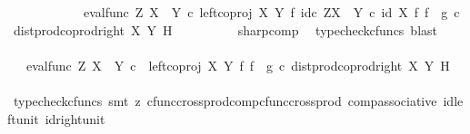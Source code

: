 \begin{isabellebody}
\ \ \ \ \ \ \ \ \ \ \ \ {\isacharparenleft}{\kern0pt}{\isacharparenleft}{\kern0pt}eval{\isacharunderscore}{\kern0pt}func\ Z\ {\isacharparenleft}{\kern0pt}X\ {\isasymCoprod}\ Y{\isacharparenright}{\kern0pt}\ {\isasymcirc}\isactrlsub c\ left{\isacharunderscore}{\kern0pt}coproj\ X\ Y\ {\isasymtimes}\isactrlsub f\ id\isactrlsub c\ {\isacharparenleft}{\kern0pt}Z\isactrlbsup {\isacharparenleft}{\kern0pt}X\ {\isasymCoprod}\ Y{\isacharparenright}{\kern0pt}\isactrlesup {\isacharparenright}{\kern0pt}{\isacharparenright}{\kern0pt}\ {\isasymcirc}\isactrlsub c\ {\isacharparenleft}{\kern0pt}id\ X\ {\isasymtimes}\isactrlsub f\ {\isacharparenleft}{\kern0pt}f\isactrlsup {\isasymflat}\ {\isasymamalg}\ g\isactrlsup {\isasymflat}\ {\isasymcirc}\isactrlsub c\ dist{\isacharunderscore}{\kern0pt}prod{\isacharunderscore}{\kern0pt}coprod{\isacharunderscore}{\kern0pt}right\ X\ Y\ H{\isacharparenright}{\kern0pt}\isactrlsup {\isasymsharp}{\isacharparenright}{\kern0pt}{\isacharparenright}{\kern0pt}\isactrlsup {\isasymsharp}{\isachardoublequoteclose}\isanewline
\ \ \ \ \ \ \ \ \isamarkupfalse%
\ sharp{\isacharunderscore}{\kern0pt}comp\ \isamarkupfalse%
\ {\isacharparenleft}{\kern0pt}typecheck{\isacharunderscore}{\kern0pt}cfuncs{\isacharcomma}{\kern0pt}\ blast{\isacharparenright}{\kern0pt}\isanewline
\ \ \ \ \ \ \isamarkupfalse%
\ \isamarkupfalse%
\ {\isachardoublequoteopen}{\isachardot}{\kern0pt}{\isachardot}{\kern0pt}{\isachardot}{\kern0pt}\ {\isacharequal}{\kern0pt}\ {\isacharparenleft}{\kern0pt}eval{\isacharunderscore}{\kern0pt}func\ Z\ {\isacharparenleft}{\kern0pt}X\ {\isasymCoprod}\ Y{\isacharparenright}{\kern0pt}\ {\isasymcirc}\isactrlsub c\ \ {\isacharparenleft}{\kern0pt}left{\isacharunderscore}{\kern0pt}coproj\ X\ Y\ {\isasymtimes}\isactrlsub f\ {\isacharparenleft}{\kern0pt}f\isactrlsup {\isasymflat}\ {\isasymamalg}\ g\isactrlsup {\isasymflat}\ {\isasymcirc}\isactrlsub c\ dist{\isacharunderscore}{\kern0pt}prod{\isacharunderscore}{\kern0pt}coprod{\isacharunderscore}{\kern0pt}right\ X\ Y\ H{\isacharparenright}{\kern0pt}\isactrlsup {\isasymsharp}{\isacharparenright}{\kern0pt}{\isacharparenright}{\kern0pt}\isactrlsup {\isasymsharp}{\isachardoublequoteclose}\isanewline
\ \ \ \ \ \ \ \ \isamarkupfalse%
\ {\isacharparenleft}{\kern0pt}typecheck{\isacharunderscore}{\kern0pt}cfuncs{\isacharcomma}{\kern0pt}\ smt\ {\isacharparenleft}{\kern0pt}z{}{\isacharparenright}{\kern0pt}\ cfunc{\isacharunderscore}{\kern0pt}cross{\isacharunderscore}{\kern0pt}prod{\isacharunderscore}{\kern0pt}comp{\isacharunderscore}{\kern0pt}cfunc{\isacharunderscore}{\kern0pt}cross{\isacharunderscore}{\kern0pt}prod\ comp{\isacharunderscore}{\kern0pt}associative{}\ id{\isacharunderscore}{\kern0pt}left{\isacharunderscore}{\kern0pt}unit{}\ id{\isacharunderscore}{\kern0pt}right{\isacharunderscore}{\kern0pt}unit{}{\isacharparenright}{\kern0pt}\isanewline

\end{isabellebody}
